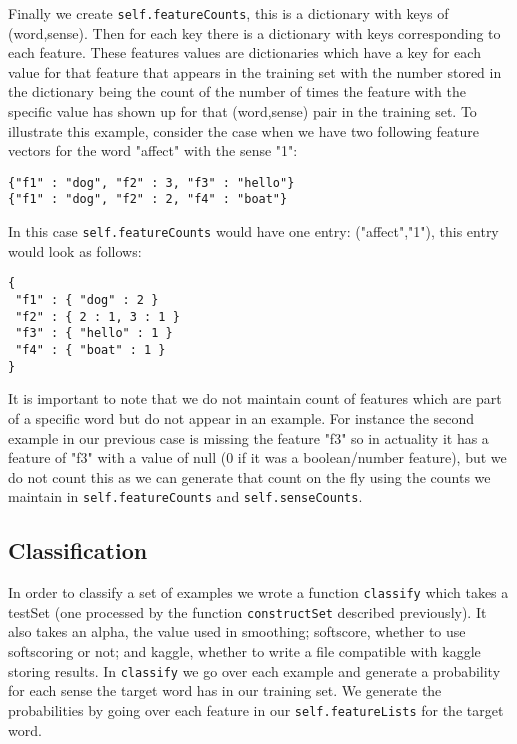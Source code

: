 \documentclass{article}
\begin{document}
Finally we create \texttt{self.featureCounts}, this is a dictionary with keys of (word,sense). Then for each key there is a dictionary with keys corresponding to each feature. These features values are dictionaries which have a key for each value for that feature that appears in the training set with the number stored in the dictionary being the count of the number of times the feature with the specific value has shown up for that (word,sense) pair in the training set. To illustrate this example, consider the case when we have two following feature vectors for the word "affect" with the sense "1":
{\small
\begin{verbatim}
{"f1" : "dog", "f2" : 3, "f3" : "hello"}
{"f1" : "dog", "f2" : 2, "f4" : "boat"}
\end{verbatim}
}
In this case \texttt{self.featureCounts} would have one entry: ("affect","1"), this entry would look as follows:
{\small
\begin{verbatim}
{
 "f1" : { "dog" : 2 }
 "f2" : { 2 : 1, 3 : 1 }
 "f3" : { "hello" : 1 }
 "f4" : { "boat" : 1 }
}
\end{verbatim}
}

It is important to note that we do not maintain count of features which are part of a specific word but do not appear in an example. For instance the second example in our previous case is missing the feature "f3" so in actuality it has a feature of "f3" with a value of null (0 if it was a boolean/number feature), but we do not count this as we can generate that count on the fly using the counts we maintain in \texttt{self.featureCounts} and \texttt{self.senseCounts}.

\subsection{Classification}

In order to classify a set of examples we wrote a function \texttt{classify} which takes a testSet (one processed by the function \texttt{constructSet} described previously). It also takes an alpha, the value used in smoothing; softscore, whether to use softscoring or not; and kaggle, whether to write a file compatible with kaggle storing results. In \texttt{classify} we go over each example and generate a probability for each sense the target word has in our training set. We generate the probabilities by going over each feature in our \texttt{self.featureLists} for the target word.
\end{document}
